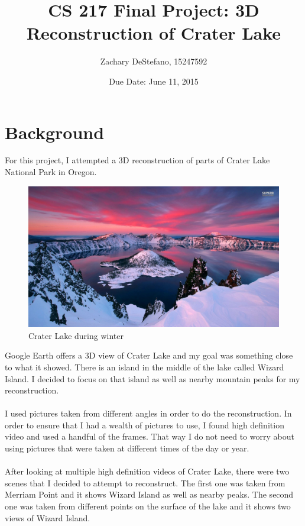 \documentclass[11pt,psfig]{article}
\begin{document}
\setlength{\parskip}{1.2ex plus0.3ex minus 0.3ex}


\thispagestyle{empty} \pagestyle{myheadings} 

\title{CS 217 Final Project: 3D Reconstruction of Crater Lake}
\author{Zachary DeStefano, 15247592}
\date{Due Date: June 11, 2015}

\maketitle

\vfill\eject

\newpage

\section{Background}

For this project, I attempted a 3D reconstruction of parts of Crater Lake National Park in Oregon.
\begin{figure}[H]
\centering
\includegraphics[width=\columnwidth]{craterLakeWinter.jpg}
\caption{Crater Lake during winter}
\end{figure}
Google Earth offers a 3D view of Crater Lake and my goal was something close to what it showed. There is an island in the middle of the lake called Wizard Island. I decided to focus on that island as well as nearby mountain peaks for my reconstruction. \\
\\
I used pictures taken from different angles in order to do the reconstruction. In order to ensure that I had a wealth of pictures to use, I found high definition video and used a handful of the frames. That way I do not need to worry about using pictures that were taken at different times of the day or year.\\
\\
After looking at multiple high definition videos of Crater Lake, there were two scenes that I decided to attempt to reconstruct. The first one was taken from Merriam Point and it shows Wizard Island as well as nearby peaks. The second one was taken from different points on the surface of the lake and it shows two views of Wizard Island. \\
\\
\newpage
\end{document}
